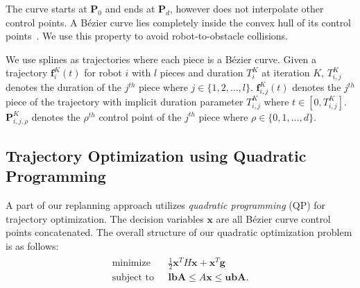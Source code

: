 \documentclass{svproc}
\newcommand{\vP}{\mathbf{P}}
\newcommand{\vg}{\mathbf{g}}
\newcommand{\vf}{\mathbf{f}}
\newcommand{\vw}{\mathbf{w}}
\newcommand{\vx}{\mathbf{x}}
\newcommand{\vlbA}{\mathbf{lbA}}
\newcommand{\vubA}{\mathbf{ubA}}
\newcommand{\vlb}{\mathbf{lb}}
\newcommand{\vub}{\mathbf{ub}}
\newcommand{\R}{\mathbb{R}} %
\begin{document}
The curve starts at $\vP_0$ and ends at $\vP_d$, however does not interpolate other control points.
A B\'ezier curve lies completely inside the convex hull of its control points~\cite{Bernstein}.
We use this property to avoid robot-to-obstacle collisions.

We use splines as trajectories where each piece is a B\'ezier curve. Given a trajectory $\vf^{K}_i(t)$ for robot $i$ with $l$ pieces and duration $T^{K}_i$ at iteration $K$, $T^{K}_{i,j}$ denotes the duration of the $j^{th}$ piece where $j \in \{1,2,\ldots,l\}$. $\vf^{K}_{i,j}(t)$ denotes the $j^{th}$ piece of the trajectory with implicit duration parameter $T^K_{i,j}$ where $t\in[0, T^{K}_{i,j}]$. $\vP^{K}_{i,j,\rho}$ denotes the $\rho^{th}$ control point of the $j^{th}$ piece where $\rho \in \{0,1,\ldots,d\}$.



\subsection{Trajectory Optimization using Quadratic Programming} \label{trajectoryOptimization}
A part of our replanning approach utilizes \emph{quadratic programming} (QP) for trajectory optimization.
The decision variables $\vx$ are all B\'ezier curve control points concatenated.
The overall structure of our quadratic optimization problem is as follows:
\begin{align}
\begin{split}
    \text{minimize}\ \ \ &\frac{1}{2}\vx^TH\vx + \vx^T\vg\\
    \text{subject to}\ \ \ & \vlbA \leq A\vx \leq \vubA.
\end{split}
\end{align}
\end{document}
